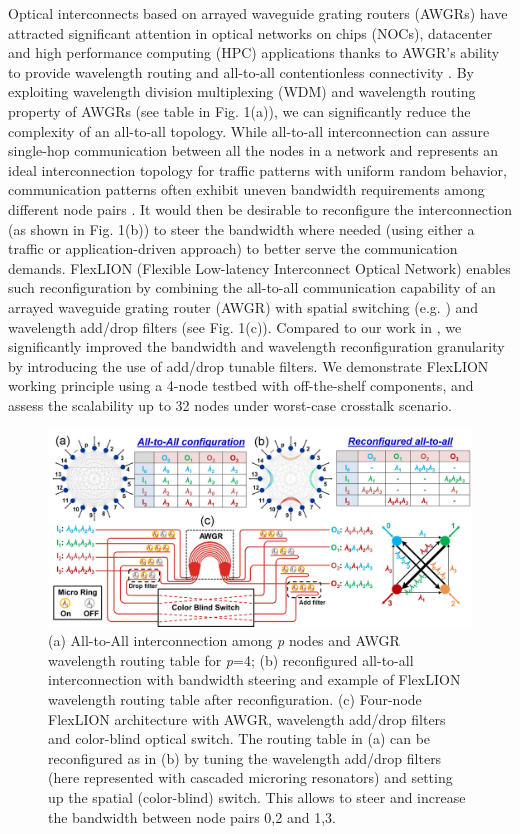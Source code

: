 \documentclass[letterpaper,10pt]{article}
\begin{document}
Optical interconnects based on arrayed waveguide grating routers (AWGRs) \cite{AWGR_XT_1996} have attracted significant attention in optical networks on chips (NOCs), datacenter and high performance computing (HPC) applications thanks to AWGR’s ability to provide wavelength routing and all-to-all contentionless connectivity \cite{JLT2015_Proietti}. By exploiting wavelength division multiplexing (WDM) and wavelength routing property of AWGRs (see table in Fig. 1(a)), we can significantly reduce the complexity of an all-to-all topology. While all-to-all interconnection can assure single-hop communication between all the nodes in a network and represents an ideal interconnection topology for traffic patterns with uniform random behavior, communication patterns often exhibit uneven bandwidth requirements among different node pairs \cite{OSA_2014}. It would then be desirable to reconfigure the interconnection (as shown in Fig. 1(b)) to steer the bandwidth where needed (using either a traffic or application-driven approach) to better serve the communication demands. FlexLION (Flexible Low-latency Interconnect Optical Network) enables such reconfiguration by combining the all-to-all communication capability of an arrayed waveguide grating router (AWGR) with spatial switching (e.g. \cite{Han:15}) and wavelength add/drop filters (see Fig. 1(c)). Compared to our work in \cite{FlexECOC2018_Xian}, we significantly improved the bandwidth and wavelength reconfiguration granularity by introducing the use of add/drop tunable filters. We demonstrate FlexLION working principle using a 4-node testbed with off-the-shelf components, and assess the scalability up to 32 nodes under worst-case crosstalk scenario. 
\vspace{-2ex}
\begin{figure}[htbp]
  \centering
  \includegraphics[width=15cm]{Figure1_v4.jpg}
\caption{(a) All-to-All interconnection among \textit{p} nodes and AWGR wavelength routing table for \textit{p}=4; (b) reconfigured all-to-all interconnection with bandwidth steering and example of FlexLION wavelength routing table after reconfiguration. (c) Four-node FlexLION architecture with AWGR, wavelength add/drop filters and color-blind optical switch. The routing table in (a) can be reconfigured as in (b) by tuning the wavelength add/drop filters (here represented with cascaded microring resonators) and setting up the spatial (color-blind) switch. This allows to steer and increase the bandwidth between node pairs 0,2 and 1,3.}
\vspace{-3ex}
\end{figure} 
\vspace{-3ex}
\end{document}
